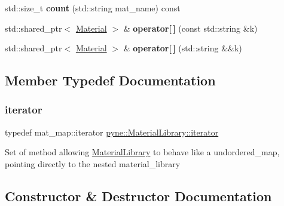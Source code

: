 \begin{DoxyCompactItemize}
\item 
\mbox{\label{classpyne_1_1_material_library_afd063989aded77d8e16c3eb9986d29ef}} 
std\+::size\+\_\+t {\bfseries count} (std\+::string mat\+\_\+name) const
\item 
\mbox{\label{classpyne_1_1_material_library_a1bf3b87be3d6c30e783604fa1bce224f}} 
std\+::shared\+\_\+ptr$<$ \hyperlink{classpyne_1_1_material}{Material} $>$ \& {\bfseries operator\mbox{[}$\,$\mbox{]}} (const std\+::string \&k)
\item 
\mbox{\label{classpyne_1_1_material_library_aa5eac668c5303785aa0d6870495792bc}} 
std\+::shared\+\_\+ptr$<$ \hyperlink{classpyne_1_1_material}{Material} $>$ \& {\bfseries operator\mbox{[}$\,$\mbox{]}} (std\+::string \&\&k)
\end{DoxyCompactItemize}


\subsection{Member Typedef Documentation}
\mbox{\label{classpyne_1_1_material_library_abb2c5af112371df0cee26b7fe7d17d89}} 
\subsubsection{\texorpdfstring{iterator}{iterator}}
{\footnotesize\ttfamily typedef mat\+\_\+map\+::iterator \hyperlink{classpyne_1_1_material_library_abb2c5af112371df0cee26b7fe7d17d89}{pyne\+::\+Material\+Library\+::iterator}}

Set of method allowing \hyperlink{classpyne_1_1_material_library}{Material\+Library} to behave like a undordered\+\_\+map, pointing directly to the nested material\+\_\+library 

\subsection{Constructor \& Destructor Documentation}
\mbox{\label{classpyne_1_1_material_library_a38e307d9c8c2f6266cc0a5b2f8f81bc5}} 
